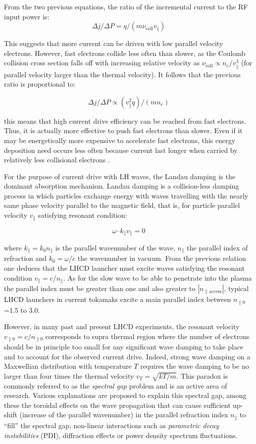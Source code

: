 From the two previous equations, the ratio of the incremental current to the RF input power is:
$$\Delta j/ \Delta P = q / (m \nu_\mathrm{coll} v_{\parallel})$$

This suggests that more current can be driven with low parallel velocity electrons. However, fast electrons collide less often than slower, as the Coulomb collision cross section falls off with increasing relative velocity as $\nu_\mathrm{coll} \propto n_e/v_{\parallel}^3$ (for parallel velocity larger than the thermal velocity). It follows that the previous ratio is proportional to: 

$$\Delta j/ \Delta P \propto (v_{\parallel}^2 q) / (m n_e)$$

this means that high current drive efficiency can be reached from fast electrons. Thus, it is actually more effective to push fast electrons than slower. Even if it may be energetically more expensive to accelerate fast electrons, this energy deposition need occurs less often because current last longer when carried by relatively less collisional electrons . 

For the purpose of current drive with LH waves, the Landau damping is the dominant absorption mechanism. Landau damping is a collision-less damping process in which particles exchange energy with waves travelling with the nearly same phase velocity parallel to the magnetic field, that is, for particle parallel velocity $v_{\parallel}$ satisfying resonant condition:

$$\omega – k_{\parallel} v_{\parallel} = 0 $$ 

where $k_{\parallel}=k_0 n_{\parallel}$ is the parallel wavenumber of the wave, $n_{\parallel}$ the parallel index of refraction and $k_0= \omega/c$ the wavenumber in vacuum. From the previous relation one deduces that the LHCD launcher must excite waves satisfying the resonant condition $v_{\parallel}=c/n_{\parallel}$. As for the slow wave to be able to penetrate into the plasma the parallel index must be greater than one and also greater to $|n_{\parallel \mathrm{access}}|$, typical LHCD launchers in current tokamaks excite a main parallel index between $n_{\parallel 0}$=1.5 to 3.0. 

However, in many past and present LHCD experiments, the resonant velocity $v_{\parallel 0}=c/n_{\parallel 0}$ corresponds to supra thermal region where the number of electrons should be in principle too small for any significant wave damping to take place and to account for the observed current drive. Indeed, strong wave damping on a Maxwellian distribution with temperature $T$ requires the wave damping to be no larger than four times the thermal velocity $v_T=\sqrt{k T/m}$. This paradox is commonly referred to as the \emph{spectral gap} problem and is an active area of research. Various explanations are proposed to explain this spectral gap, among these the toroidal effects on the wave propagation that can cause sufficient up-shift (increase of the parallel wavenumber) in the parallel refraction index $n_{\parallel}$ to “fill” the spectral gap, non-linear interactions such as \textit{parametric decay instabilities} (PDI), diffraction effects or power density spectrum fluctuations. 

